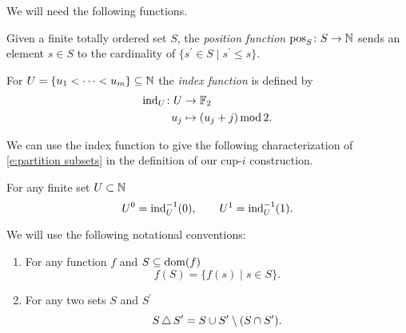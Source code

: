 We will need the following functions.

\begin{definition} \label{d:position function}
	Given a finite totally ordered set $S$, the \textit{position function} $\operatorname{pos}_S \colon S \to \mathbb{N}$ sends an element $s \in S$ to the cardinality of $\{s^\prime \in S \mid s^\prime \leq s\}$.
\end{definition}

\begin{definition} \label{d:index function}
	For $U = \{u_1 < \cdots < u_m\} \subseteq \mathbb{N}$ the \textit{index function} is defined by
	\[
	\begin{split}
	\mathrm{ind}_U \colon U & \to {\mathbb{F}_2} \\
	u_j & \mapsto (u_j + j) \operatorname{mod} 2.
	\end{split}
	\]
\end{definition}

We can use the index function to give the following characterization of \eqref{e:partition subsets} in the definition of our cup-$i$ construction.

\begin{lemma} \label{l:partition via index function}
	For any finite set $U \subset \mathbb{N}$
	\[
	U^0 = \mathrm{ind}_U^{-1}(0), \qquad
	U^1 = \mathrm{ind}_U^{-1}(1).
	\]
\end{lemma}

\begin{notation}
	We will use the following notational conventions:
	\begin{enumerate}
		\item For any function $f$ and $S \subseteq \operatorname{dom}(f)$
		\[
		f(S) = \{ f(s) \mid s \in S\}.
		\]
		\item For any two sets $S$ and $S^\prime$
		\[
		S \operatorname{\triangle} S^\prime = S \cup S^\prime \setminus (S \cap S^\prime).
		\]
	\end{enumerate}
\end{notation}

